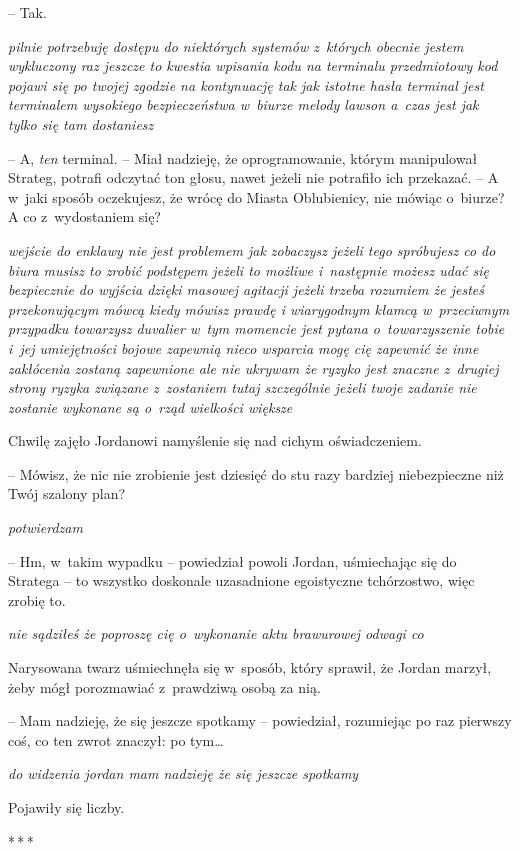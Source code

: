 \documentclass[oneside,polish,11pt,sfheadings]{mwbk}
\newcommand{\threeast}{\bigskip\par\centerline{*\,*\,*}\medskip\par}%
\begin{document}
-- Tak.

\emph{pilnie potrzebuję dostępu do niektórych systemów z~których obecnie
jestem wykluczony raz jeszcze to kwestia wpisania kodu na terminalu
przedmiotowy kod pojawi się po twojej zgodzie na kontynuację tak jak
istotne hasła terminal jest terminalem wysokiego bezpieczeństwa w~biurze
melody lawson a~czas jest jak tylko się tam dostaniesz}

-- A, \emph{ten} terminal. -- Miał nadzieję, że oprogramowanie, którym
manipulował Strateg, potrafi odczytać ton głosu, nawet jeżeli nie
potrafiło ich przekazać. -- A w~jaki sposób oczekujesz, że wrócę do
Miasta Oblubienicy, nie mówiąc o~biurze? A co z~wydostaniem się?

\emph{wejście do enklawy nie jest problemem jak zobaczysz jeżeli tego
spróbujesz co do biura musisz to zrobić podstępem jeżeli to możliwe i~następnie możesz udać się bezpiecznie do wyjścia dzięki masowej agitacji
jeżeli trzeba rozumiem że jesteś przekonującym mówcą kiedy mówisz prawdę
i wiarygodnym kłamcą w~przeciwnym przypadku towarzysz duvalier w~tym
momencie jest pytana o~towarzyszenie tobie i~jej umiejętności bojowe
zapewnią nieco wsparcia mogę cię zapewnić że inne zakłócenia zostaną
zapewnione ale nie ukrywam że ryzyko jest znaczne z~drugiej strony
ryzyka związane z~zostaniem tutaj szczególnie jeżeli twoje zadanie nie
zostanie wykonane są o~rząd wielkości większe}

Chwilę zajęło Jordanowi namyślenie się nad cichym oświadczeniem.

-- Mówisz, że nic nie zrobienie jest dziesięć do stu razy bardziej
niebezpieczne niż Twój szalony plan?

\emph{potwierdzam}

-- Hm, w~takim wypadku -- powiedział powoli Jordan, uśmiechając się do
Stratega -- to wszystko doskonale uzasadnione egoistyczne tchórzostwo,
więc zrobię to.

\emph{nie sądziłeś że poproszę cię o~wykonanie aktu brawurowej odwagi
co}

Narysowana twarz uśmiechnęła się w~sposób, który sprawił, że Jordan
marzył, żeby mógł porozmawiać z~prawdziwą osobą za nią.

-- Mam nadzieję, że się jeszcze spotkamy -- powiedział, rozumiejąc po raz
pierwszy coś, co ten zwrot znaczył: po tym\ldots

\emph{do widzenia jordan mam nadzieję że się jeszcze spotkamy}

Pojawiły się liczby.

\threeast
\end{document}
